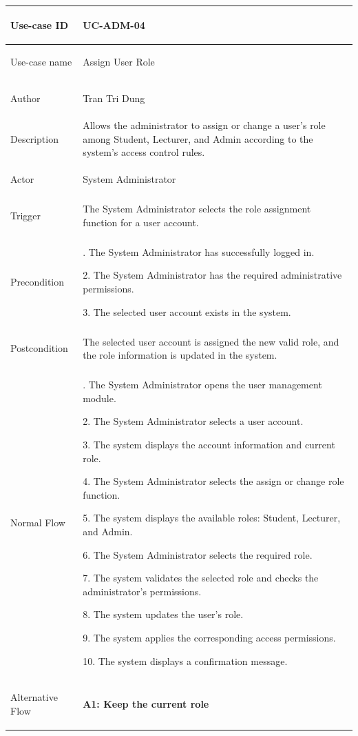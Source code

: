 \begin{longtable}{|>{\bfseries\raggedright\arraybackslash}p{}|>{\raggedright\arraybackslash}p{}|}
\hline
Use-case ID & UC-ADM-04 \\ \hline
Use-case name & Assign User Role \\ \hline
Author & Tran Tri Dung \\ \hline
Description & Allows the administrator to assign or change a user's role among Student, Lecturer, and Admin according to the system's access control rules. \\ \hline
Actor & System Administrator \\ \hline
Trigger & The System Administrator selects the role assignment function for a user account. \\ \hline
Precondition &
1. The System Administrator has successfully logged in. \par
2. The System Administrator has the required administrative permissions. \par
3. The selected user account exists in the system. \\ \hline
Postcondition & The selected user account is assigned the new valid role, and the role information is updated in the system. \\ \hline
Normal Flow &
1. The System Administrator opens the user management module. \par
2. The System Administrator selects a user account. \par
3. The system displays the account information and current role. \par
4. The System Administrator selects the assign or change role function. \par
5. The system displays the available roles: Student, Lecturer, and Admin. \par
6. The System Administrator selects the required role. \par
7. The system validates the selected role and checks the administrator's permissions. \par
8. The system updates the user's role. \par
9. The system applies the corresponding access permissions. \par
10. The system displays a confirmation message. \\ \hline
Alternative Flow &
\textbf{A1: Keep the current role} \par

\end{longtable}
